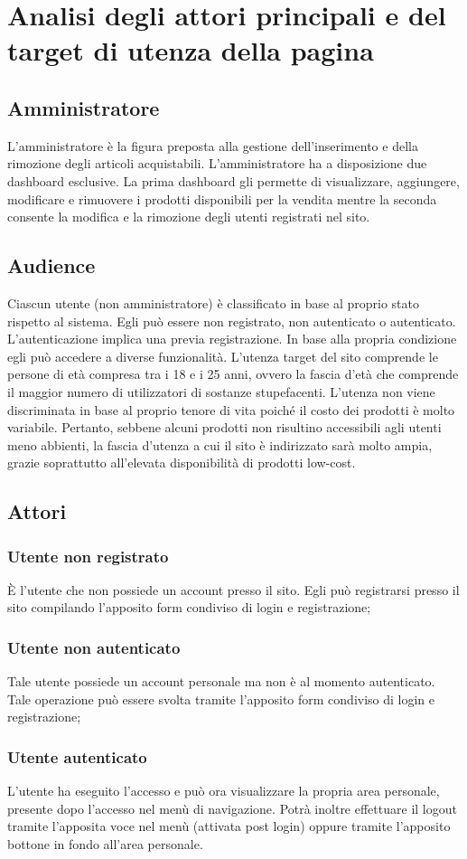 \section{Analisi degli attori principali e del target di utenza della pagina}

\subsection{Amministratore} L'amministratore è la figura preposta alla gestione dell'inserimento e della rimozione degli articoli acquistabili. L'amministratore ha a disposizione due dashboard esclusive. La prima dashboard gli permette di visualizzare, aggiungere, modificare e rimuovere i prodotti disponibili per la vendita mentre la seconda consente la modifica e la rimozione degli utenti registrati nel sito.

\subsection{Audience}Ciascun utente (non amministratore) è classificato in base al proprio stato rispetto al sistema. Egli può essere non registrato, non autenticato o autenticato. L'autenticazione implica una previa registrazione. In base alla propria condizione egli può accedere a diverse funzionalità. L'utenza target del sito comprende le persone di età compresa tra i 18 e i 25 anni, ovvero la fascia d'età che comprende il maggior numero di utilizzatori di sostanze stupefacenti. L'utenza non viene discriminata in base al proprio tenore di vita poiché il costo dei prodotti è molto variabile. Pertanto, sebbene alcuni prodotti non risultino accessibili agli utenti meno abbienti, la fascia d'utenza a cui il sito è indirizzato sarà molto ampia, grazie soprattutto all'elevata disponibilità di prodotti low-cost.

\subsection{Attori}
\subsubsection{Utente non registrato} \`E l'utente che non possiede un account presso il sito. Egli può registrarsi presso il sito compilando l'apposito form condiviso di login e registrazione;
\subsubsection{Utente non autenticato} Tale utente possiede un account personale ma non è al momento autenticato. Tale operazione può essere svolta tramite l'apposito form condiviso di login e registrazione;
\subsubsection{Utente autenticato} L'utente ha eseguito l'accesso e può ora visualizzare la propria area personale, presente dopo l'accesso nel menù di navigazione. Potrà inoltre effettuare il logout tramite l'apposita voce nel menù (attivata post login) oppure tramite l'apposito bottone in fondo all'area personale.




